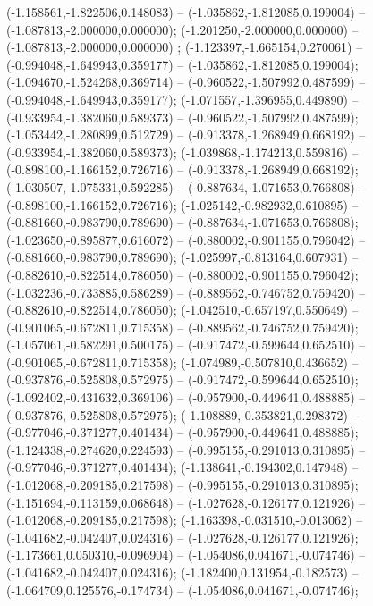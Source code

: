 (-1.158561,-1.822506,0.148083) -- (-1.035862,-1.812085,0.199004) -- (-1.087813,-2.000000,0.000000);
 (-1.201250,-2.000000,0.000000) -- (-1.087813,-2.000000,0.000000) ;
 (-1.123397,-1.665154,0.270061) -- (-0.994048,-1.649943,0.359177) -- (-1.035862,-1.812085,0.199004);
 (-1.094670,-1.524268,0.369714) -- (-0.960522,-1.507992,0.487599) -- (-0.994048,-1.649943,0.359177);
 (-1.071557,-1.396955,0.449890) -- (-0.933954,-1.382060,0.589373) -- (-0.960522,-1.507992,0.487599);
 (-1.053442,-1.280899,0.512729) -- (-0.913378,-1.268949,0.668192) -- (-0.933954,-1.382060,0.589373);
 (-1.039868,-1.174213,0.559816) -- (-0.898100,-1.166152,0.726716) -- (-0.913378,-1.268949,0.668192);
 (-1.030507,-1.075331,0.592285) -- (-0.887634,-1.071653,0.766808) -- (-0.898100,-1.166152,0.726716);
 (-1.025142,-0.982932,0.610895) -- (-0.881660,-0.983790,0.789690) -- (-0.887634,-1.071653,0.766808);
 (-1.023650,-0.895877,0.616072) -- (-0.880002,-0.901155,0.796042) -- (-0.881660,-0.983790,0.789690);
 (-1.025997,-0.813164,0.607931) -- (-0.882610,-0.822514,0.786050) -- (-0.880002,-0.901155,0.796042);
 (-1.032236,-0.733885,0.586289) -- (-0.889562,-0.746752,0.759420) -- (-0.882610,-0.822514,0.786050);
 (-1.042510,-0.657197,0.550649) -- (-0.901065,-0.672811,0.715358) -- (-0.889562,-0.746752,0.759420);
 (-1.057061,-0.582291,0.500175) -- (-0.917472,-0.599644,0.652510) -- (-0.901065,-0.672811,0.715358);
 (-1.074989,-0.507810,0.436652) -- (-0.937876,-0.525808,0.572975) -- (-0.917472,-0.599644,0.652510);
 (-1.092402,-0.431632,0.369106) -- (-0.957900,-0.449641,0.488885) -- (-0.937876,-0.525808,0.572975);
 (-1.108889,-0.353821,0.298372) -- (-0.977046,-0.371277,0.401434) -- (-0.957900,-0.449641,0.488885);
 (-1.124338,-0.274620,0.224593) -- (-0.995155,-0.291013,0.310895) -- (-0.977046,-0.371277,0.401434);
 (-1.138641,-0.194302,0.147948) -- (-1.012068,-0.209185,0.217598) -- (-0.995155,-0.291013,0.310895);
 (-1.151694,-0.113159,0.068648) -- (-1.027628,-0.126177,0.121926) -- (-1.012068,-0.209185,0.217598);
 (-1.163398,-0.031510,-0.013062) -- (-1.041682,-0.042407,0.024316) -- (-1.027628,-0.126177,0.121926);
 (-1.173661,0.050310,-0.096904) -- (-1.054086,0.041671,-0.074746) -- (-1.041682,-0.042407,0.024316);
 (-1.182400,0.131954,-0.182573) -- (-1.064709,0.125576,-0.174734) -- (-1.054086,0.041671,-0.074746);
